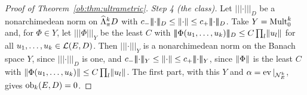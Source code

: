 \begin{proof}[Proof of Theorem~\ref{ob:thm:ultrametric}]
\emph{Step 4 (the class).} Let $\lvert\!\lvert\!\lvert\cdot\rvert\!\rvert\!\rvert_D$ be a nonarchimedean norm on $\widehat\Lambda^k_\pi D$ with
$c_-\lvert\!\lvert\!\lvert\cdot\rvert\!\rvert\!\rvert_D\le\norm\cdot\le c_+\lvert\!\lvert\!\lvert\cdot\rvert\!\rvert\!\rvert_D$. Take $Y=\operatorname{Mult}^k_0$ and, for $\Phi\in Y$, let
$\lvert\!\lvert\!\lvert\Phi\rvert\!\rvert\!\rvert_Y$ be the least $C$ with $\lvert\!\lvert\!\lvert\Phi(u_1,\dots,u_k)\rvert\!\rvert\!\rvert_D\le C\prod_l\lVert u_l\rVert$ for all $u_1,\dots,u_k\in\mathcal L(E,D)$.
Then $\lvert\!\lvert\!\lvert\cdot\rvert\!\rvert\!\rvert_Y$ is a nonarchimedean norm on the Banach space $Y$, since $\lvert\!\lvert\!\lvert\cdot\rvert\!\rvert\!\rvert_D$ is one, and $c_-\lvert\!\lvert\!\lvert\cdot\rvert\!\rvert\!\rvert_Y\le\norm\cdot\le c_+\lvert\!\lvert\!\lvert\cdot\rvert\!\rvert\!\rvert_Y$,
since $\lVert \Phi\rVert$ is the least $C$ with $\lVert \Phi(u_1,\dots,u_k)\rVert\le C\prod_l\lVert u_l\rVert$. The first part, with this $Y$ and
$\alpha=\operatorname{ev}|_{\mathcal N^k_E}$, gives $\operatorname{ob}_k(E,D)=0$.
\end{proof}
